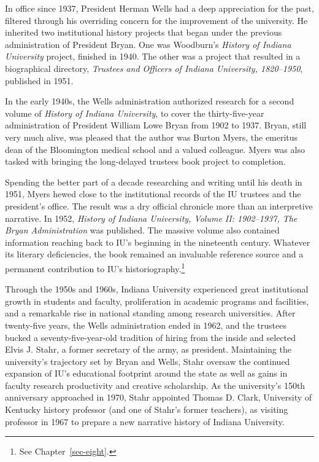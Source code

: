 \documentclass[
  american,
  letterpaper,
]{scrreprt}
\begin{document}
In office since 1937, President Herman Wells had a deep appreciation for
the past, filtered through his overriding concern for the improvement of
the university. He inherited two institutional history projects that
began under the previous administration of President Bryan. One was
Woodburn's \emph{History of Indiana University} project, finished in
1940. The other was a project that resulted in a biographical directory,
\emph{Trustees and Officers of Indiana University, 1820--1950},
published in 1951.

In the early 1940s, the Wells administration authorized research for a
second volume of \emph{History of Indiana University}, to cover the
thirty-five-year administration of President William Lowe Bryan from
1902 to 1937. Bryan, still very much alive, was pleased that the author
was Burton Myers, the emeritus dean of the Bloomington medical school
and a valued colleague. Myers was also tasked with bringing the
long-delayed trustees book project to completion.

Spending the better part of a decade researching and writing until his
death in 1951, Myers hewed close to the institutional records of the IU
trustees and the president's office. The result was a dry official
chronicle more than an interpretive narrative. In 1952, \emph{History of
Indiana University, Volume II: 1902--1937, The Bryan Administration} was
published. The massive volume also contained information reaching back
to IU's beginning in the nineteenth century. Whatever its literary
deficiencies, the book remained an invaluable reference source and a
permanent contribution to IU's historiography.\footnote{See
  Chapter~\ref{sec-eight}.}

Through the 1950s and 1960s, Indiana University experienced great
institutional growth in students and faculty, proliferation in academic
programs and facilities, and a remarkable rise in national standing
among research universities. After twenty-five years, the Wells
administration ended in 1962, and the trustees bucked a
seventy-five-year-old tradition of hiring from the inside and selected
Elvis J. Stahr, a former secretary of the army, as president.
Maintaining the university's trajectory set by Bryan and Wells, Stahr
oversaw the continued expansion of IU's educational footprint around the
state as well as gains in faculty research productivity and creative
scholarship. As the university's 150th anniversary approached in 1970,
Stahr appointed Thomas D. Clark, University of Kentucky history
professor (and one of Stahr's former teachers), as visiting professor in
1967 to prepare a new narrative history of Indiana University.
\end{document}
